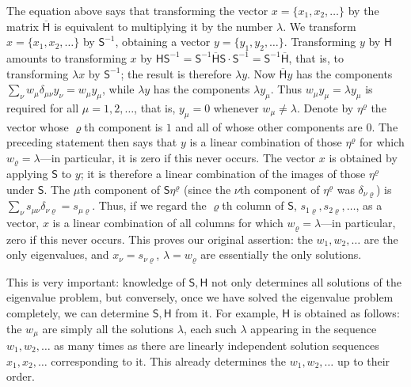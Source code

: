 \documentclass[fontsize=13pt,twoside,openany,headings=normal,parskip=false,bookmarkpackage=false,DIV=calc]{scrbook}
\begin{document}
The equation above says that transforming the vector $x=\{x_1,x_2,\ldots\}$ by the matrix $\overline{\mathsf{H}}$ is equivalent to multiplying it by the number $\lambda$. We transform $x=\{x_1,x_2,\ldots\}$ by $\mathsf{S}^{-1}$, obtaining a vector $y=\{y_1,y_2,\ldots\}$. Transforming $y$ by $\mathsf{H}$ amounts to transforming $x$ by $\mathsf{H}\mathsf{S}^{-1}=\mathsf{S}^{-1}\overline{\mathsf{H}}\mathsf{S}\cdot \mathsf{S}^{-1}=\mathsf{S}^{-1}\overline{\mathsf{H}}$, that is, to transforming $\lambda x$ by $\mathsf{S}^{-1}$; the result is therefore $\lambda y$. Now $\overline{\mathsf{H}}y$ has the components $\sum_\nu w_\mu\delta_{\mu\nu}y_\nu=w_\mu y_\mu$, while $\lambda y$ has the components $\lambda y_\mu$. Thus $w_\mu y_\mu=\lambda y_\mu$ is required for all $\mu=1,2,\ldots$, that is, $y_\mu=0$ whenever $w_\mu\ne\lambda$. Denote by $\eta^\varrho$ the vector whose $\varrho$th component is $1$ and all of whose other components are $0$. The preceding statement then says that $y$ is a linear combination of those $\eta^\varrho$ for which $w_\varrho=\lambda$---in particular, it is zero if this never occurs. The vector $x$ is obtained by applying $\mathsf{S}$ to $y$; it is therefore a linear combination of the images of those $\eta^\varrho$ under $\mathsf{S}$. The $\mu$th component of $\mathsf{S}\eta^\varrho$ (since the $\nu$th component of $\eta^\varrho$ was $\delta_{\nu\varrho}$) is $\sum_\nu s_{\mu\nu}\delta_{\nu\varrho}=s_{\mu\varrho}$. Thus, if we regard the $\varrho$th column of $\mathsf{S}$, $s_{1\varrho},s_{2\varrho},\ldots$, as a vector, $x$ is a linear combination of all columns for which $w_\varrho=\lambda$---in particular, zero if this never occurs. This proves our original assertion: the $w_1,w_2,\ldots$ are the only eigenvalues, and $x_\nu=s_{\nu\varrho}$, $\lambda=w_\varrho$ are essentially the only solutions.

This is very important: knowledge of $\mathsf{S},\mathsf{H}$ not only determines all solutions of the eigenvalue problem, but conversely, once we have solved the eigenvalue problem completely, we can determine $\mathsf{S},\mathsf{H}$ from it. For example, $\mathsf{H}$ is obtained as follows: the $w_\mu$ are simply all the solutions $\lambda$, each such $\lambda$ appearing in the sequence $w_1,w_2,\ldots$ as many times as there are linearly independent solution sequences $x_1,x_2,\ldots$ corresponding to it.
\hypertarget{origpage-12}{}%
This already determines the $w_1,w_2,\ldots$ up to their order.
\end{document}

